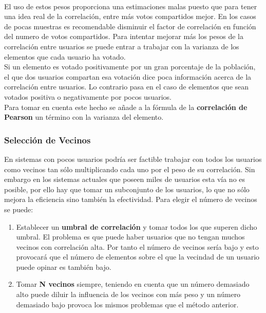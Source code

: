 \documentclass[12pt,letterpaper,oneside] {memoir}
\begin{document}
\paragraph{}
El uso de estos pesos proporciona una estimaciones malas puesto que para tener una idea real de la correlación, entre más votos compartidos mejor. En los casos de pocas muestras es recomendable disminuir el factor de correlación en función del numero de votos compartidos. Para intentar mejorar más los pesos de la correlación entre usuarios se puede entrar a trabajar con la varianza de los elementos que cada usuario ha votado. \\
Si un elemento es votado positivamente por un gran porcentaje de la población, el que dos usuarios compartan esa votación dice poca información acerca de la correlación entre usuarios. Lo contrario pasa en el caso de elementos que sean votados positiva o negativamente por pocos usuarios. \\
Para tomar en cuenta este hecho se añade a la fórmula de la \textbf{correlación de Pearson} un término con la varianza del elemento.

\subsubsection*{Selección de Vecinos}

En sistemas con pocos usuarios podría ser factible trabajar con todos los usuarios como vecinos tan sólo multiplicando cada uno por el peso de su correlación. Sin embargo en los sistemas actuales que poseen miles de usuarios esta vía no es posible, por ello hay que tomar un subconjunto de los usuarios, lo que no sólo mejora la eficiencia sino también la efectividad. Para elegir el número de vecinos se puede:
\begin{enumerate}
\item Establecer un \textbf{umbral de correlación} y tomar todos los que superen dicho umbral. El problema es que puede haber usuarios que no tengan muchos vecinos con correlación alta. Por tanto el número de vecinos sería bajo y esto provocará que el número de elementos sobre el que la vecindad de un usuario puede opinar es también bajo.
\item Tomar \textbf{N vecinos} siempre, teniendo en cuenta que un número demasiado alto puede diluir la influencia de los vecinos con más peso y un número demasiado bajo provoca los mismos problemas que el método anterior.
\end{enumerate}
\end{document}
